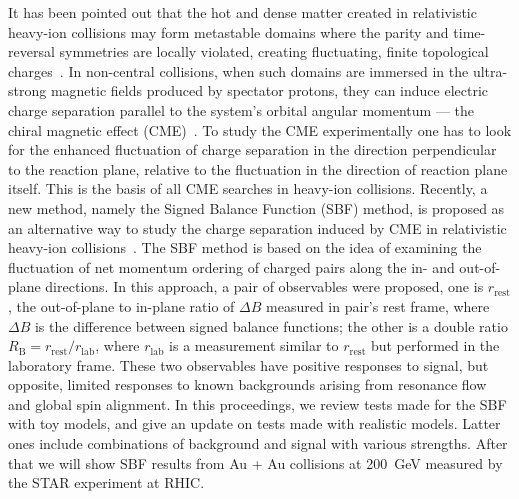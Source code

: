It has been pointed out that the hot and dense matter created in relativistic heavy-ion collisions may form metastable domains where the parity and
time-reversal symmetries are locally violated, creating fluctuating, finite topological charges~\cite{ref1}. In non-central collisions, when such domains are immersed  in the ultra-strong magnetic fields produced by spectator protons,  they can induce electric charge separation parallel to the system's orbital angular momentum --- the chiral magnetic effect (CME)~\cite{ref2}. 
To study the CME experimentally one has to look for the enhanced fluctuation of charge separation in the direction perpendicular to the reaction plane, relative to the fluctuation in the direction of reaction plane itself. This is the basis of all CME searches in heavy-ion collisions.
Recently,  a new method,  namely the Signed Balance Function (SBF) method, is proposed as an alternative way to study the charge separation induced by CME in relativistic heavy-ion collisions~\cite{tang2019probe}.
The SBF method is based on the idea of examining the fluctuation of net momentum ordering of charged pairs along the in- and out-of-plane directions.  In this approach, a pair of observables were proposed,  one is $r_{\mathrm{rest}}$, the out-of-plane to in-plane ratio of $\Delta B$ measured in pair's rest frame, where $\Delta B$ is the difference between signed balance functions; the other is a double ratio $R_{\mathrm{B}} = r_{\mathrm{rest}}/r_{\mathrm{lab}}$,  where $r_{\mathrm{lab}}$ is a measurement similar to $r_{\mathrm{rest}}$ but performed in the laboratory frame.
These two observables have positive responses to signal, but opposite, limited responses to known backgrounds arising from resonance flow and global spin alignment. In this proceedings, we review tests made for the SBF with toy models, and give an update on tests made with realistic models. Latter ones include combinations of background and signal with various strengths. After that we will show SBF results from Au + Au collisions at 200~GeV measured by the STAR experiment at RHIC. 

\vspace{-0.38cm}

\label{results}

\vspace{-0.08cm}


